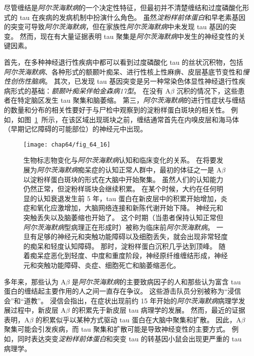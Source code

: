 尽管缠结是\textit{阿尔茨海默病}的一个决定性特征，但最初并不清楚缠结和过度磷酸化形式的 tau 在疾病的发病机制中扮演什么角色。
虽然\textit{淀粉样前体蛋白}和早老素基因的突变可导致\textit{阿尔茨海默病}，但在家族性\textit{阿尔茨海默病}中未发现 tau 基因的突变。
然而，现在有大量证据表明 tau 聚集是\textit{阿尔茨海默病}中发生的神经变性的关键因素。


首先，在多种神经退行性疾病中都可以看到过度磷酸化 tau 的丝状沉积物，包括\textit{阿尔茨海默病}、各种形式的额颞叶痴呆、进行性核上性麻痹、皮层基底节变性和\textit{慢性创伤性脑病}。
其次，已发现 tau 基因突变是另一种常染色体显性神经退行性疾病形式的基础：\textit{额颞叶痴呆伴帕金森病17型}。
在没有 A$\beta$ 沉积的情况下，这些患者在特定脑区发生 tau 聚集和脑萎缩。
第三，\textit{阿尔茨海默病}的进行性症状与缠结的数量和分布的相关性要好于与尸检中观察到的淀粉样蛋白斑块的相关性。
例如，如图~\ref{fig:64_16}~所示，在该区域出现斑块之前，缠结通常首先在内嗅皮层和海马体（早期记忆障碍的可能部位）的神经元中出现。


\begin{figure}[htbp]
	\centering
	\texttt{[image: chap64/fig\_64\_16]}
	\caption{生物标志物变化与\textit{阿尔茨海默病}认知和临床变化的关系。
		在将要发展为\textit{阿尔茨海默病}痴呆症的认知正常人群中，最初的体征之一是 A$\beta$ 以淀粉样蛋白斑块的形式在大脑中开始聚集。
		虽然人们的认知能力仍然正常，但淀粉样斑块会继续积累。
		在某个时候，大约在任何明显的认知衰退发生前 5 年，tau 蛋白在新皮层中的积累开始增加，炎症和氧化应激增加，大脑网络连接和新陈代谢开始下降。
		神经元和突触丢失以及脑萎缩也开始了。
		这个时期（当患者保持认知正常但\textit{阿尔茨海默病}型病理正在形成时）被称为临床前\textit{阿尔茨海默病}。
		一旦有足够的神经元和突触功能障碍以及细胞丢失，就会出现非常轻度的痴呆和轻度认知障碍。
		那时，淀粉样蛋白沉积几乎达到顶峰。
		随着痴呆症恶化到轻度、中度和重度阶段，神经原纤维缠结形成，神经元和突触功能障碍、炎症、细胞死亡和脑萎缩恶化\cite{perrin2009multimodal}。}
	\label{fig:64_16}
\end{figure}


多年来，那些认为 A$\beta$ 是\textit{阿尔茨海默病}的主要致病因子的人和那些认为富含 tau 蛋白的缠结起主要作用的人之间一直存在争议。
这些游击队员分别被称为“浸信会”和“道教”。
浸信会指出，在症状出现前约 15 年开始的\textit{阿尔茨海默病}病理学发展过程中，新皮层 A$\beta$ 的积累先于新皮层 tau 病理学的发展。
然而，最近的证据表明，A$\beta$ 的积累似乎以某种方式驱动 tau 蛋白在大脑中聚集和扩散。
因此，A$\beta$ 聚集可能会引发疾病，而 tau 聚集和扩散可能是导致神经变性的主要方式。
例如，同时表达突变\textit{淀粉样前体蛋白}和突变 tau 的转基因小鼠会出现更严重的 tau 病理学。


